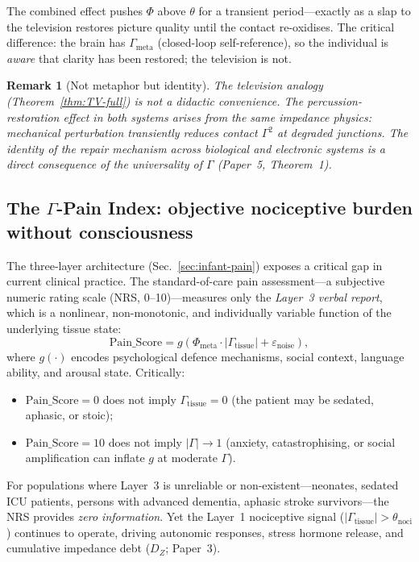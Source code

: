 \documentclass[aps,pre,twocolumn,superscriptaddress,floatfix]{revtex4-2}
\newtheorem{remark}{Remark}
\begin{document}
The combined effect pushes $\Phi$ above $\theta$ for
a transient period---exactly as a slap to the television
restores picture quality until the contact re-oxidises.
The critical difference: the brain has $\Gamma_{\text{meta}}$
(closed-loop self-reference), so the individual is
\emph{aware} that clarity has been restored;
the television is not.

\begin{remark}[Not metaphor but identity]
The television analogy (Theorem~\ref{thm:TV-full}) is not
a didactic convenience.
The percussion-restoration effect in both systems arises
from the same impedance physics: mechanical perturbation
transiently reduces contact $\Gamma^2$ at degraded
junctions.
The identity of the repair mechanism across biological
and electronic systems is a direct consequence of the
universality of $\Gamma$ (Paper~5, Theorem~1).
\end{remark}

\subsection{The $\Gamma$-Pain Index: objective nociceptive
  burden without consciousness}
\label{sec:gamma-pain-index}

The three-layer architecture (Sec.~\ref{sec:infant-pain})
exposes a critical gap in current clinical practice.
The standard-of-care pain assessment---a subjective
numeric rating scale (NRS, 0--10)---measures only the
\emph{Layer~3 verbal report}, which is a nonlinear,
non-monotonic, and individually variable function of the
underlying tissue state:
\begin{equation}
  \text{Pain\_Score} =
    g\!\left(
      \Phi_{\text{meta}}\cdot|\Gamma_{\text{tissue}}|
      + \varepsilon_{\text{noise}}
    \right),
  \label{eq:pain-score-function}
\end{equation}
where $g(\cdot)$ encodes psychological defence mechanisms,
social context, language ability, and arousal state.
Critically:
\begin{itemize}
  \item $\text{Pain\_Score}=0$ does not imply
    $\Gamma_{\text{tissue}}=0$
    (the patient may be sedated, aphasic, or stoic);
  \item $\text{Pain\_Score}=10$ does not imply
    $|\Gamma|\to 1$
    (anxiety, catastrophising, or social amplification
    can inflate $g$ at moderate $\Gamma$).
\end{itemize}

For populations where Layer~3 is unreliable or
non-existent---neonates, sedated ICU patients, persons
with advanced dementia, aphasic stroke survivors---the
NRS provides \emph{zero information}.
Yet the Layer~1 nociceptive signal
($|\Gamma_{\text{tissue}}|>\theta_{\text{noci}}$)
continues to operate, driving autonomic responses,
stress hormone release, and cumulative impedance debt
($D_Z$; Paper~3).
\end{document}
